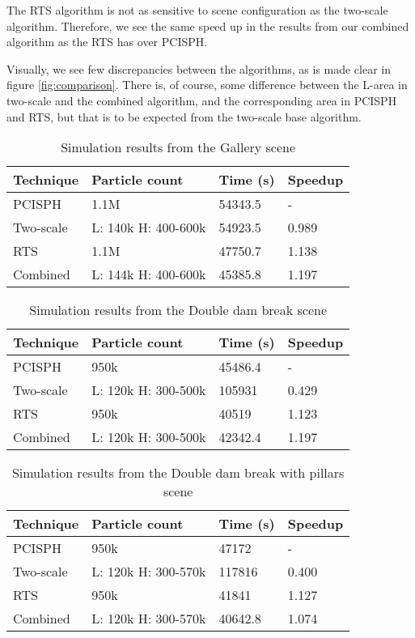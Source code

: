 \documentclass[../../main.tex]{subfiles}
\begin{document}
The RTS algorithm is not as sensitive to scene configuration as the two-scale algorithm. 
Therefore, we see the same speed up in the results from our combined algorithm as the RTS has over PCISPH. 

Visually, we see few discrepancies between the algorithms, as is made clear in figure \ref{fig:comparison}. There is, of course, some difference between the L-area in two-scale and the combined algorithm, and the corresponding area in PCISPH and RTS, but that is to be expected from the two-scale base algorithm. 

\begin{table}[]
\centering
\caption{Simulation results from the Gallery scene}
\label{table:gallery}
\begin{tabular}{llll}
\hline
Technique & Particle count      & Time (s) & Speedup \\ \hline
PCISPH    & 1.1M                & 54343.5  & -       \\
Two-scale & L: 140k H: 400-600k & 54923.5  & 0.989   \\
RTS       & 1.1M                & 47750.7  & 1.138   \\
Combined  & L: 144k H: 400-600k & 45385.8  & 1.197   \\ \hline
\end{tabular}
\end{table}


\begin{table}[]
\centering
\caption{Simulation results from the Double dam break scene}
\label{table:doubledam}
\begin{tabular}{llll}
\hline
Technique & Particle count      & Time (s) & Speedup \\ \hline
PCISPH    & 950k                & 45486.4  & -       \\
Two-scale & L: 120k H: 300-500k & 105931   & 0.429   \\
RTS       & 950k                & 40519    & 1.123   \\
Combined  & L: 120k H: 300-500k & 42342.4  & 1.197   \\ \hline
\end{tabular}
\end{table}

\begin{table}[]
\centering
\caption{Simulation results from the Double dam break with pillars scene}
\label{table:pillars}
\begin{tabular}{llll}
\hline
Technique & Particle count      & Time (s) & Speedup \\ \hline
PCISPH    & 950k                & 47172    & -       \\
Two-scale & L: 120k H: 300-570k & 117816   & 0.400   \\
RTS       & 950k                & 41841    & 1.127   \\
Combined  & L: 120k H: 300-570k & 40642.8  & 1.074   \\ \hline
\end{tabular}
\end{table}
\end{document}
